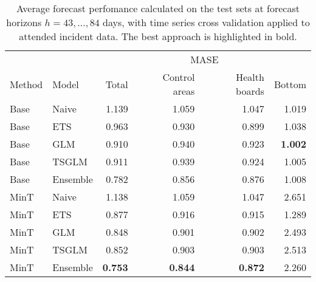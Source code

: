 \documentclass[
  authoryear,
  preprint,
  3p]{elsarticle}
\begin{document}
\begin{table}

\caption{\label{tbl-result}Average forecast perfomance calculated on the
test sets at forecast horizons \(h=43,\dots,84\) days, with time series
cross validation applied to attended incident data. The best approach is
highlighted in bold.}\begin{minipage}[t]{\linewidth}

{\centering 

\tabularnewline

\centering
\begin{tabular}[t]{llrrrr}
\toprule
\multicolumn{2}{c}{ } & \multicolumn{4}{c}{MASE} \\
\cmidrule(l{3pt}r{3pt}){3-6}
Method & Model & Total & Control areas & Health boards & Bottom\\
\midrule
Base & Naive & 1.139 & 1.059 & 1.047 & 1.019\\
Base & ETS & 0.963 & 0.930 & 0.899 & 1.038\\
Base & GLM & 0.910 & 0.940 & 0.923 & \textbf{1.002}\\
Base & TSGLM & 0.911 & 0.939 & 0.924 & 1.005\\
Base & Ensemble & 0.782 & 0.856 & 0.876 & 1.008\\
\addlinespace
MinT & Naive & 1.138 & 1.059 & 1.047 & 2.651\\
MinT & ETS & 0.877 & 0.916 & 0.915 & 1.289\\
MinT & GLM & 0.848 & 0.901 & 0.902 & 2.493\\
MinT & TSGLM & 0.852 & 0.903 & 0.903 & 2.513\\
MinT & Ensemble & \textbf{0.753} & \textbf{0.844} & \textbf{0.872} & 2.260\\
\bottomrule
\end{tabular}

}

\end{minipage}%
\newline
\begin{minipage}[t]{\linewidth}

{\centering 

\tabularnewline

}
\end{minipage}
\end{table}
\end{document}
